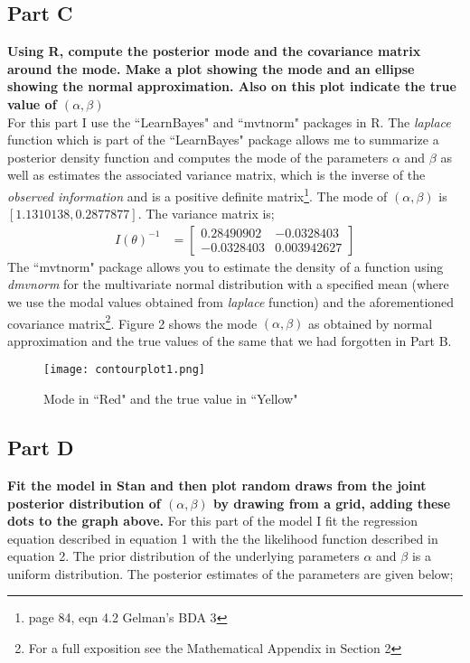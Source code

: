\documentclass{article}
\begin{document}
\subsection{Part C}
\textbf{Using R, compute the posterior mode and the covariance matrix around the mode. Make a plot showing the mode and an ellipse showing the normal approximation. Also on this plot indicate the true value of $(\alpha,\beta)$}\\
For this part I use the ``LearnBayes" and ``mvtnorm" packages in R. The \textit{laplace} function which is part of the ``LearnBayes" package allows me to summarize a posterior density function and computes the mode of the parameters $\alpha$ and $\beta$ as well as estimates the associated variance matrix, which is the inverse of the \textit{observed information} and is a positive definite matrix\footnote{page 84, eqn 4.2 Gelman's BDA 3}. The mode of $(\alpha, \beta)$ is $[1.1310138, 0.2877877]$. The variance matrix is;
\begin{align*}
I(\theta)^{-1} &=\begin{bmatrix}
0.28490902 & -0.0328403 \\
-0.0328403 & 0.003942627
\end{bmatrix}
\end{align*}
The ``mvtnorm" package allows you to estimate the density of a function using \textit{dmvnorm} for the multivariate normal distribution with a specified mean (where we use the modal values obtained from \textit{laplace} function) and the aforementioned covariance matrix\footnote{For a full exposition see the Mathematical Appendix in Section 2}.
Figure 2 shows the mode $(\alpha,\beta)$ as obtained by normal approximation and the true values of the same that we had forgotten in Part B.
 \begin{figure}[H]
\centering
\texttt{[image: contourplot1.png]}
\caption{Mode in ``Red" and the true value in ``Yellow"}
\label{deltat}
\end{figure}
\newpage
\subsection{Part D}
\textbf{Fit the model in Stan and then plot random draws from the joint posterior distribution of $(\alpha,\beta)$ by drawing from a grid, adding these dots to the graph above.}
For this part of the model I fit the regression equation described in equation 1 with the the likelihood function described in equation 2. The prior distribution of the underlying parameters $\alpha$ and $\beta$ is a uniform distribution. The posterior estimates of the parameters are given below;
\end{document}
